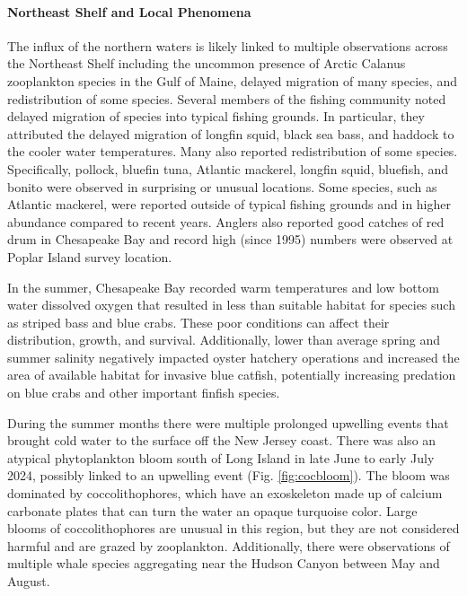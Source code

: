 \documentclass[
  10pt,
]{article}
\begin{document}
\hypertarget{northeast-shelf-and-local-phenomena}{%
\paragraph{Northeast Shelf and Local Phenomena}\label{northeast-shelf-and-local-phenomena}}

The influx of the northern waters is likely linked to multiple observations across the Northeast Shelf including the uncommon presence of Arctic Calanus zooplankton species in the Gulf of Maine, delayed migration of many species, and redistribution of some species. Several members of the fishing community noted delayed migration of species into typical fishing grounds. In particular, they attributed the delayed migration of longfin squid, black sea bass, and haddock to the cooler water temperatures. Many also reported redistribution of some species. Specifically, pollock, bluefin tuna, Atlantic mackerel, longfin squid, bluefish, and bonito were observed in surprising or unusual locations. Some species, such as Atlantic mackerel, were reported outside of typical fishing grounds and in higher abundance compared to recent years. Anglers also reported good catches of red drum in Chesapeake Bay and record high (since 1995) numbers were observed at Poplar Island survey location.

In the summer, Chesapeake Bay recorded warm temperatures and low bottom water dissolved oxygen that resulted in less than suitable habitat for species such as striped bass and blue crabs. These poor conditions can affect their distribution, growth, and survival. Additionally, lower than average spring and summer salinity negatively impacted oyster hatchery operations and increased the area of available habitat for invasive blue catfish, potentially increasing predation on blue crabs and other important finfish species.

During the summer months there were multiple prolonged upwelling events that brought cold water to the surface off the New Jersey coast. There was also an atypical phytoplankton bloom south of Long Island in late June to early July 2024, possibly linked to an upwelling event (Fig. \ref{fig:cocbloom}). The bloom was dominated by coccolithophores, which have an exoskeleton made up of calcium carbonate plates that can turn the water an opaque turquoise color. Large blooms of coccolithophores are unusual in this region, but they are not considered harmful and are grazed by zooplankton. Additionally, there were observations of multiple whale species aggregating near the Hudson Canyon between May and August.
\end{document}
